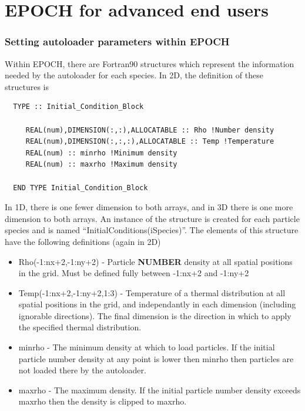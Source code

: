 \documentclass[12pt]{article}
\begin{document}
\section{EPOCH for advanced end users}
\subsubsection{Setting autoloader parameters within EPOCH}
Within EPOCH, there are Fortran90 structures which represent the information needed by the autoloader for each species. In 2D, the definition of these structures is

\begin{verbatim}
  TYPE :: Initial_Condition_Block

     REAL(num),DIMENSION(:,:),ALLOCATABLE :: Rho !Number density
     REAL(num),DIMENSION(:,:,:),ALLOCATABLE :: Temp !Temperature
     REAL(num) :: minrho !Minimum density
     REAL(num) :: maxrho !Maximum density

  END TYPE Initial_Condition_Block
\end{verbatim}
In 1D, there is one fewer dimension to both arrays, and in 3D there is one more dimension to both arrays. An instance of the structure is created for each particle species and is named ``InitialConditions(iSpecies)''. The elements of this structure have the following definitions (again in 2D)\\
\begin{itemize}
\item Rho(-1:nx+2,-1:ny+2) - Particle {\bf NUMBER} density at all spatial positions in the grid. Must be defined fully between -1:nx+2 and -1:ny+2
\item Temp(-1:nx+2,-1:ny+2,1:3) - Temperature of a thermal distribution at all spatial positions in the grid, and independantly in each dimension (including ignorable directions). The final dimension is the direction in which to apply the specified thermal distribution.
\item minrho - The minimum density at which to load particles. If the initial particle number density at any point is lower then minrho then particles are not loaded there by the autoloader.
\item maxrho - The maximum density. If the initial particle number density exceeds maxrho then the density is clipped to maxrho.
\end{itemize}
\end{document}

